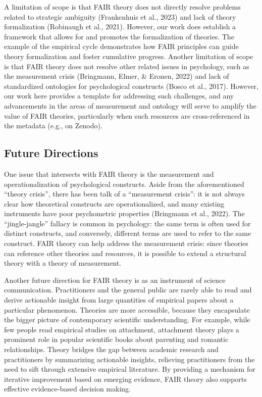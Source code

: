 \documentclass[
  man, noextraspace,floatsintext]{apa6}
\begin{document}
A limitation of scope is that FAIR theory does not directly resolve problems related to strategic ambiguity (Frankenhuis et al., 2023) and lack of theory formalization (Robinaugh et al., 2021).
However, our work does establish a framework that allows for and promotes the formalization of theories.
The example of the empirical cycle demonstrates how FAIR principles can guide theory formalization and foster cumulative progress.
Another limitation of scope is that FAIR theory does not resolve other related issues in psychology, such as the measurement crisis (Bringmann, Elmer, \& Eronen, 2022) and lack of standardized ontologies for psychological constructs (Bosco et al., 2017).
However, our work here provides a template for addressing such challenges,
and any advancements in the areas of measurement and ontology will serve to amplify the value of FAIR theories, particularly when such resources are cross-referenced in the metadata (e.g., on Zenodo).

\subsection{Future Directions}\label{future-directions}

One issue that intersects with FAIR theory is the measurement and operationalization of psychological constructs.
Aside from the aforementioned ``theory crisis'', there has been talk of a ``measurement crisis'':
it is not always clear how theoretical constructs are operationalized, and many existing instruments have poor psychometric properties (Bringmann et al., 2022).
The ``jingle-jangle'' fallacy is common in psychology:
the same term is often used for distinct constructs, and conversely, different terms are used to refer to the same construct.
FAIR theory can help address the measurement crisis:
since theories can reference other theories and resources, it is possible to extend a structural theory with a theory of measurement.

Another future direction for FAIR theory is as an instrument of science communication. Practitioners and the general public are rarely able to read and derive actionable insight from large quantities of empirical papers about a particular phenomenon.
Theories are more accessible, because they encapsulate the bigger picture of contemporary scientific understanding.
For example, while few people read empirical studies on attachment,
attachment theory plays a prominent role in popular scientific books about parenting and romantic relationships.
Theory bridges the gap between academic research and practitioners by summarizing actionable insights, relieving practitioners from the need to sift through extensive empirical literature.
By providing a mechanism for iterative improvement based on emerging evidence, FAIR theory also supports effective evidence-based decision making.
\end{document}
